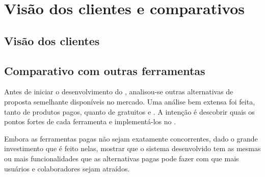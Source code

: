 \section{Visão dos clientes e comparativos}

\subsection{Visão dos clientes}


\subsection{Comparativo com outras ferramentas}

Antes de iniciar o desenvolvimento do \calopsita{}, analisou-se outras alternativas de proposta semelhante disponíveis no mercado. Uma análise bem extensa foi feita, tanto de produtos pagos, quanto de gratuitos e \opensource{}. A intenção é descobrir quais os pontos fortes de cada ferramenta e implementá-los no \calopsita{}. 

Embora as ferramentas pagas não sejam exatamente concorrentes, dado o grande investimento que é feito nelas, mostrar que o sistema desenvolvido tem as mesmas ou mais funcionalidades que as alternativas pagas pode fazer com que mais usuários e colaboradores sejam atraídos.


